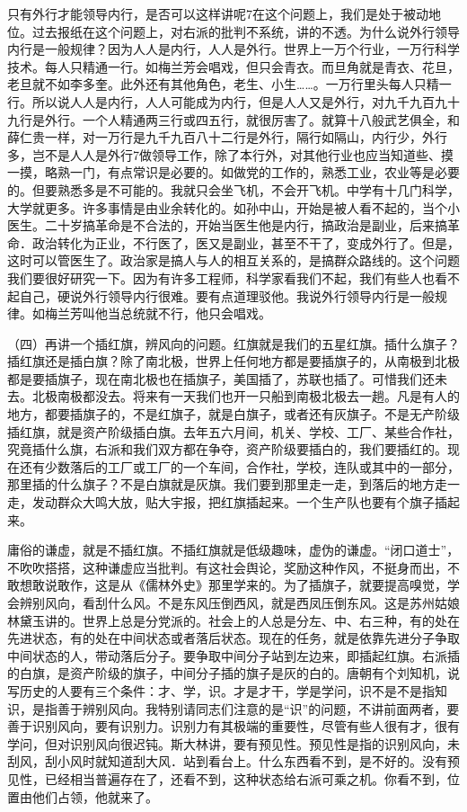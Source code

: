 只有外行才能领导内行，是否可以这样讲呢7在这个问题上，我们是处于被动地位。过去报纸在这个问题上，对右派的批判不系统，讲的不透。为什么说外行领导内行是一般规律？因为人人是内行，人人是外行。世界上一万个行业，一万行科学技术。每人只精通一行。如梅兰芳会唱戏，但只会青衣。而旦角就是青衣、花旦，老旦就不如李多奎。此外还有其他角色，老生、小生……。一万行里头每人只精一行。所以说人人是内行，人人可能成为内行，但是人人又是外行，对九千九百九十九行是外行。一个人精通两三行或四五行，就很厉害了。就算十八般武艺俱全，和薛仁贵一样，对一万行是九千九百八十二行是外行，隔行如隔山，内行少，外行多，岂不是人人是外行7做领导工作，除了本行外，对其他行业也应当知道些、摸一摸，略熟一门，有点常识是必要的。如做党的工作的，熟悉工业，农业等是必要的。但要熟悉多是不可能的。我就只会坐飞机，不会开飞机。中学有十几门科学，大学就更多。许多事情是由业余转化的。如孙中山，开始是被人看不起的，当个小医生。二十岁搞革命是不合法的，开始当医生他是内行，搞政治是副业，后来搞革命．政治转化为正业，不行医了，医又是副业，甚至不干了，变成外行了。但是，这时可以管医生了。政治家是搞人与人的相互关系的，是搞群众路线的。这个问题我们要很好研究一下。因为有许多工程师，科学家看我们不起，我们有些人也看不起自己，硬说外行领导内行很难。要有点道理驳他。我说外行领导内行是一般规律。如梅兰芳叫他当总统就不行，他只会唱戏。

（四）再讲一个插红旗，辨风向的问题。红旗就是我们的五星红旗。插什么旗子？插红旗还是插白旗？除了南北极，世界上任何地方都是要插旗子的，从南极到北极都是要插旗子，现在南北极也在插旗子，美国插了，苏联也插了。可惜我们还未去。北极南极都没去。将来有一天我们也开一只船到南极北极去一趟。凡是有人的地方，都要插旗子的，不是红旗子，就是白旗子，或者还有灰旗子。不是无产阶级插红旗，就是资产阶级插白旗。去年五六月间，机关、学校、工厂、某些合作社，究竟插什么旗，右派和我们双方都在争夺，资产阶级要插白的，我们要插红的。现在还有少数落后的工厂或工厂的一个车间，合作社，学校，连队或其中的一部分，那里插的什么旗子？不是白旗就是灰旗。我们要到那里走一走，到落后的地方走一走，发动群众大鸣大放，贴大宇报，把红旗插起来。一个生产队也要有个旗子插起来。

庸俗的谦虚，就是不插红旗。不插红旗就是低级趣味，虚伪的谦虚。“闭口道士”，不吹吹搭搭，这种谦虚应当批判。有这社会舆论，奖励这种作风，不挺身而出，不敢想敢说敢作，这是从《儒林外史》那里学来的。为了插旗子，就要提高嗅觉，学会辨别风向，看刮什么风。不是东风压倒西风，就是西凤压倒东风。这是苏州姑娘林黛玉讲的。世界上总是分党派的。社会上的人总是分左、中、右三种，有的处在先进状态，有的处在中间状态或者落后状态。现在的任务，就是依靠先进分子争取中间状态的人，带动落后分子。要争取中间分子站到左边来，即插起红旗。右派插的白旗，是资产阶级的旗子，中间分子插的旗子是灰的白的。唐朝有个刘知机，说写历史的人要有三个条件：才、学，识。才是才干，学是学问，识不是不是指知识，是指善于辨别风向。我特别请同志们注意的是“识”的问题，不讲前面两者，要善于识别风向，要有识别力。识别力有其极端的重要性，尽管有些人很有才，很有学问，但对识别风向很迟钝。斯大林讲，要有预见性。预见性是指的识别风向，未刮风，刮小风时就知道刮大风．站到看台上。什么东西看不到，是不好的。没有预见性，已经相当普遍存在了，还看不到，这种状态给右派可乘之机。你看不到，位置由他们占领，他就来了。

